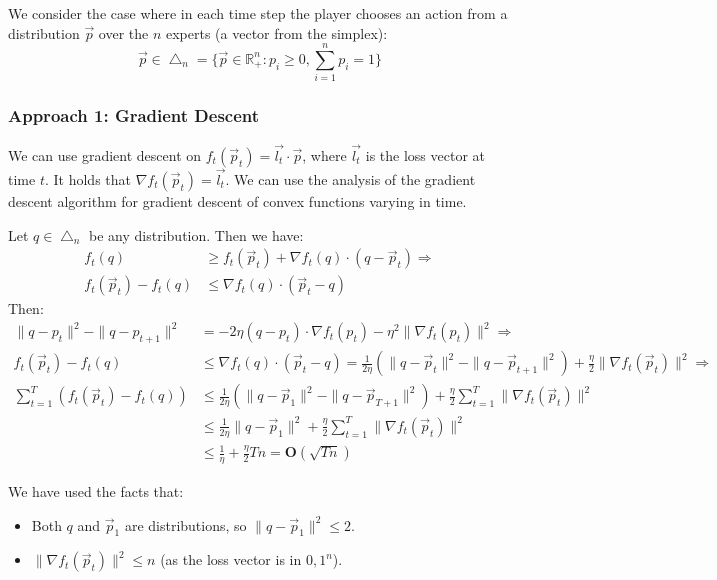 \documentclass[11pt]{book} %
\begin{document}
We consider the case where in each time step the player chooses an action from a distribution $\vec{p}$ over the $n$ experts (a vector from the simplex):
\begin{equation*}
    \vec{p} \in \bigtriangleup_n = \{ \vec{p} \in \mathbb{R}_+^n : p_i \geq 0, \sum_{i=1}^n p_i = 1 \}
\end{equation*}

\subsubsection{Approach 1: Gradient Descent}
We can use gradient descent on $f_t(\vec{p}_t) = \vec{l_t} \cdot \vec{p}$, where $\vec{l_t}$ is the loss vector at time $t$.
It holds that $\nabla f_t(\vec{p}_t) = \vec{l_t}$. We can use the analysis of the gradient descent algorithm for gradient descent of convex functions varying in time.

Let $q \in \bigtriangleup_n$ be any distribution. Then we have:
\begin{align*}
    f_t(q) &\geq f_t(\vec{p}_t) + \nabla f_t(q) \cdot (q - \vec{p}_t) \Longrightarrow \\
    f_t(\vec{p}_t) - f_t(q) &\leq \nabla f_t(q) \cdot (\vec{p}_t - q) 
\end{align*}
Then:
\begin{align*}
    \| q - p_t \|^2 - \| q - p_{t+1} \|^2 &= - 2 \eta (q - p_t) \cdot \nabla f_t(p_t) - \eta^2 \| \nabla f_t(p_t) \|^2  \Longrightarrow \\
    f_t(\vec{p}_t) - f_t(q) &\leq \nabla f_t(q) \cdot (\vec{p}_t - q)  = \frac{1}{2\eta} \left( \| q - \vec{p}_t \|^2  - \| q - \vec{p}_{t+1} \|^2 \right) + \frac{\eta}{2} \| \nabla f_t(\vec{p}_t) \|^2 \Longrightarrow \\ 
    \sum_{t=1}^T \left( f_t(\vec{p}_t) - f_t(q) \right) &\leq \frac{1}{2\eta} \left( \| q - \vec{p}_1 \|^2 - \| q - \vec{p}_{T+1} \|^2 \right)+ \frac{\eta}{2} \sum_{t=1}^T \| \nabla f_t(\vec{p}_t) \|^2 \\
    &\leq \frac{1}{2\eta} \| q - \vec{p}_1 \|^2 + \frac{\eta}{2} \sum_{t=1}^T \| \nabla f_t(\vec{p}_t) \|^2 \\
    &\leq \frac{1}{\eta} + \frac{\eta}{2} T n  = \textbf{O} ( \sqrt{Tn} )
\end{align*}

We have used the facts that: 
\begin{itemize}
    \item Both $q$ and $\vec{p}_1$ are distributions, so $\| q - \vec{p}_1 \|^2 \leq 2$.
    \item $\| \nabla f_t(\vec{p}_t) \|^2 \leq n$ (as the loss vector is in ${0,1}^n$).
\end{itemize}
\end{document}

